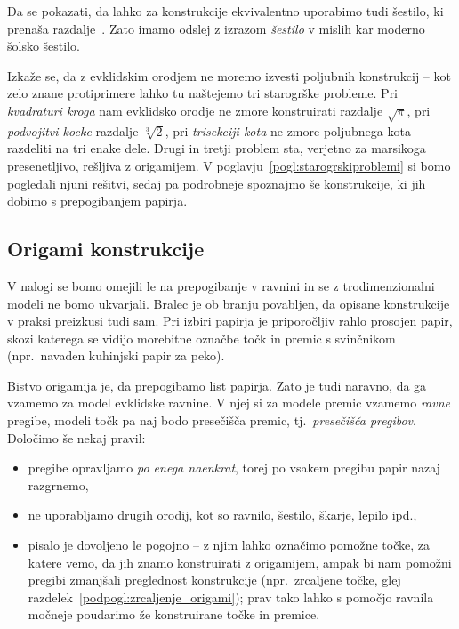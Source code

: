 \begin{opomba}
    \label{opom:solsko_sestilo}
    Da se pokazati, da lahko za konstrukcije ekvivalentno uporabimo tudi šestilo, ki prenaša razdalje~\cite[str.\ 6--7]{geometricconstructions}. Zato imamo odslej z izrazom \emph{šestilo} v mislih kar moderno šolsko šestilo.
\end{opomba}

Izkaže se, da z evklidskim orodjem ne moremo izvesti poljubnih konstrukcij -- kot zelo znane protiprimere lahko tu naštejemo tri starogrške probleme. Pri \emph{kvadraturi kroga} nam evklidsko orodje ne zmore konstruirati razdalje $\sqrt{\pi}$, pri \emph{podvojitvi kocke} razdalje $\sqrt[3]{2}$, pri \emph{trisekciji kota} ne zmore poljubnega kota razdeliti na tri enake dele. Drugi in tretji problem sta, verjetno za marsikoga presenetljivo, rešljiva z origamijem. V poglavju~\ref{pogl:starogrskiproblemi} si bomo pogledali njuni rešitvi, sedaj pa podrobneje spoznajmo še konstrukcije, ki jih dobimo s prepogibanjem papirja.

\subsection{Origami konstrukcije}
\label{origami_konstrukcije}

V nalogi se bomo omejili le na prepogibanje v ravnini in se z trodimenzionalni modeli ne bomo ukvarjali. Bralec je ob branju povabljen, da opisane konstrukcije v praksi preizkusi tudi sam. Pri izbiri papirja je priporočljiv rahlo prosojen papir, skozi katerega se vidijo morebitne označbe točk in premic s svinčnikom (npr.\ navaden kuhinjski papir za peko).

Bistvo origamija je, da prepogibamo list papirja. Zato je tudi naravno, da ga vzamemo za model evklidske ravnine. V njej si za modele premic vzamemo \emph{ravne} pregibe, modeli točk pa naj bodo presečišča premic, tj.\ \emph{presečišča pregibov}. Določimo še nekaj pravil:
\begin{itemize}
    \item pregibe opravljamo \emph{po enega naenkrat}, torej po vsakem pregibu papir nazaj razgrnemo,
    \item ne uporabljamo drugih orodij, kot so ravnilo, šestilo, škarje, lepilo ipd.,
    \item pisalo je dovoljeno le pogojno -- z njim lahko označimo pomožne točke, za katere vemo, da jih znamo konstruirati z origamijem, ampak bi nam pomožni pregibi zmanjšali preglednost konstrukcije (npr.\ zrcaljene točke, glej razdelek~\ref{podpogl:zrcaljenje_origami}); prav tako lahko s pomočjo ravnila močneje poudarimo že konstruirane točke in premice.
\end{itemize}

